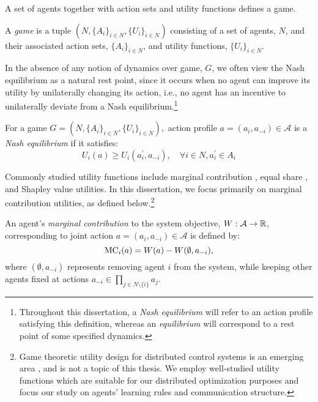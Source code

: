 A set of agents together with action sets and utility functions defines a game.

\begin{defn}
A {\it game} is a tuple $(N,\{A_i\}_{i\in N}, \{U_i\}_{i\in N})$ consisting of a set of agents, $N$, and their associated action sets, $\{A_i\}_{i\in N}$, and utility functions, $\{U_i\}_{i\in N}$.
\end{defn}

In the absence of any notion of dynamics over game, $G$, we often view the Nash equilibrium as a natural rest point, since it occurs when no agent can improve its utility by unilaterally changing its action, i.e., no agent has an incentive to unilaterally deviate from a Nash equilibrium.\footnote{Throughout this dissertation, a {\it Nash equilibrium} will refer to an action profile satisfying this definition, whereas an {\it equilibrium} will correspond to a rest point of some specified dynamics.}

\begin{defn}
For a game $G = \left(N,\{A_i\}_{i\in N},\{U_i\}_{i\in N}\right),$ action profile $a = (a_i,a_{-i})\in \mathcal{A}$ is a {\it Nash equilibrium} \cite{Nash1950} if it satisfies:
$$U_i(a)\geq U_i(a_i^\prime,a_{-i}),\quad \forall i\in N, a_i^\prime\in A_i$$
\end{defn}


Commonly studied utility functions include marginal contribution \cite{Wolpert1999}, equal share \cite{Arslan2007,Marden2008}, and Shapley value \cite{Shapley1964} utilities. In this dissertation, we focus primarily on marginal contribution utilities, as defined below.\footnote{Game theoretic utility design for distributed control systems is an emerging area \cite{Marden2013d}, and is not a topic of this thesis. We employ well-studied utility functions which are suitable for our distributed optimization purposes and focus our study on agents' learning rules and communication structure.} 



\begin{defn}
An agent's {\it marginal contribution}\cite{Wolpert1999} to the system objective, $W:\mathcal{A}\to \mathbb{R}$, corresponding to joint action $a = (a_i,a_{-i})\in \mathcal{A}$ is defined by:
$${\rm MC}_i(a) = W(a) - W(\emptyset,a_{-i}),$$
where $(\emptyset,a_{-i})$ represents removing agent $i$ from the system, while keeping other agents fixed at actions $a_{-i}\in \prod_{j\in N\setminus\{i\}}a_j.$
\end{defn}

